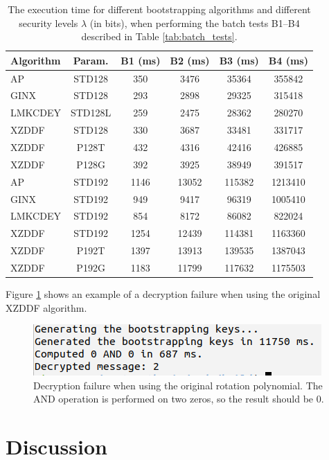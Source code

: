 \begin{table}[ht]
\centering
\caption{The execution time for different bootstrapping algorithms and different security levels $\lambda$ (in bits), when performing the batch tests B1--B4 described in Table \ref{tab:batch_tests}.}
\begin{tabular}{lc|cccc}
\toprule
\textbf{Algorithm} & \textbf{Param.} & \textbf{B1} (ms)  & \textbf{B2} (ms) & \textbf{B3} (ms) & \textbf{B4} (ms) \\
\midrule
AP & STD128 & 350 & 3476 & 35364 & 355842 \\
GINX & STD128 & 293 & 2898 & 29325 & 315418 \\
LMKCDEY & STD128L & 259 & 2475 & 28362 & 280270 \\
XZDDF & STD128 & 330 & 3687 & 33481 & 331717 \\
XZDDF & P128T & 432 & 4316 & 42416 & 426885 \\
XZDDF & P128G & 392 & 3925 & 38949 & 391517 \\
AP & STD192 & 1146 & 13052 & 115382 & 1213410 \\
GINX & STD192 & 949 & 9417 & 96319 & 1005410 \\
LMKCDEY & STD192 & 854 & 8172 & 86082 & 822024 \\
XZDDF & STD192 & 1254 & 12439 & 114381 & 1163360 \\
XZDDF & P192T & 1397 & 13913 & 139535 & 1387043 \\
XZDDF & P192G & 1183 & 11799 & 117632 & 1175503 \\
\bottomrule
\end{tabular}
\label{tab:batch_res}
\end{table}

Figure \ref{fig:decr_fail} shows an example of a decryption failure when using the original XZDDF algorithm.

\begin{figure}
    \centering
    \includegraphics[trim={2 2 5 0},clip,width=0.8\linewidth]{data/figures/failure.png}
    \caption{Decryption failure when using the original rotation polynomial. The AND operation is performed on two zeros, so the result should be 0.}
    \label{fig:decr_fail}
\end{figure}


\section{Discussion}


